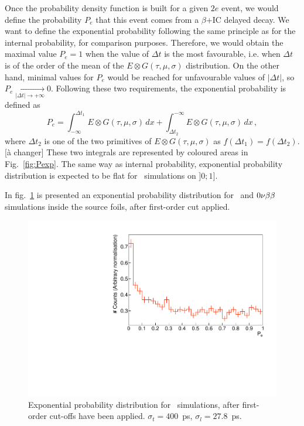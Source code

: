 Once the probability density function is built for a given $2e$ event, we would define the probability $P_{e}$ that this event comes from a $\beta$+IC delayed decay.
We want to define the exponential probability following the same principle as for the internal probability, for comparison purposes.
Therefore, we would obtain the maximal value $P_{e}=1$ when the value of $\Delta t$ is the most favourable, i.e. when $\Delta t$ is of the order of the mean of the $E \otimes G (\tau,\mu,\sigma)$ distribution.
On the other hand, minimal values for $P_{e}$ would be reached for unfavourable values of $|\Delta t|$, so $P_{e} \xrightarrow[|\Delta t| \rightarrow +\infty]{} 0$.
Following these two requirements, the exponential probability is defined as
\begin{equation}
  P_{e} = \int_{-\infty}^{\Delta t_{1}} E \otimes G (\tau,\mu,\sigma)\, dx + \int_{\Delta t_{2}}^{-\infty} E \otimes G (\tau,\mu,\sigma)\, dx\,,
\end{equation}
where $\Delta t_{2}$ is one of the two primitives of $E \otimes G (\tau,\mu,\sigma)$ as $f(\Delta t_{1})=f(\Delta t_{2})$.[à changer]
These two integrals are represented by coloured areas in Fig.~\ref{fig:Pexp}.
The same way as internal probability, exponential probability distribution is expected to be flat for \Tl\ simulations on $]0;1]$.

In fig.~\ref{fig:Pexp_Tl} is presented an exponential probability distribution for \Tl\ and $0\nu\beta\beta$ simulations inside the source foils, after first-order cut applied.
\begin{figure}[!h]
  \centering
  \includegraphics[width=13cm]{timedifference/fig_timediff/208Tl_expo.pdf}
  \caption{Exponential probability distribution for \Tl\ simulations, after first-order cut-offs have been applied.
    $\sigma_{t}=400$~ps, $\sigma_{l}=27.8$~ps.
    \label{fig:Pexp_Tl}}
\end{figure}

